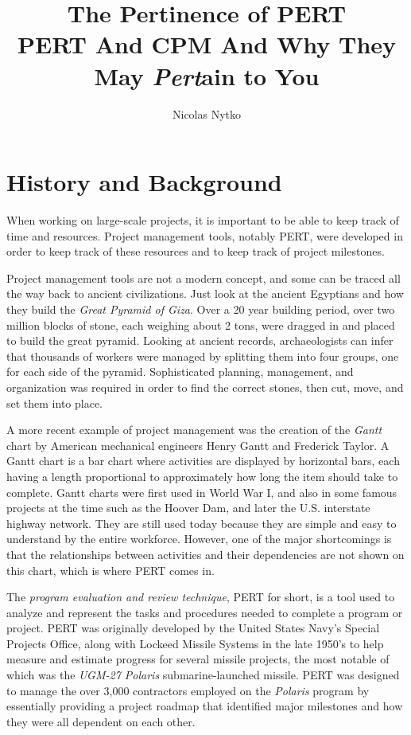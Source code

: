\documentclass[12pt]{article}
\title{The Pertinence of PERT \\[0.25in]
  \small PERT And CPM And Why They May \textit{Pert}ain to You}
\author{Nicolas Nytko}
\begin{document}
\maketitle
\newpage

\doublespacing

\section{History and Background}
When working on large-scale projects, it is important to be able to keep track of time and resources.
Project management tools, notably PERT, were developed in order to keep track of these resources and to keep track of project milestones.

Project management tools are not a modern concept, and some can be traced all the way back to ancient civilizations.  Just look at the ancient Egyptians and how they build the \textit{Great Pyramid of Giza}.  Over a 20 year building period, over two million blocks of stone, each weighing about 2 tons, were dragged in and placed to build the great pyramid.  Looking at ancient records, archaeologists can infer that thousands of workers were managed by splitting them into four groups, one for each side of the pyramid.  Sophisticated planning, management, and organization was required in order to find the correct stones, then cut, move, and set them into place.

A more recent example of project management was the creation of the \textit{Gantt} chart by American mechanical engineers Henry Gantt and Frederick Taylor.
A Gantt chart is a bar chart where activities are displayed by horizontal bars, each having a length proportional to approximately how long the item should take to complete.
Gantt charts were first used in World War I, and also in some famous projects at the time such as the Hoover Dam, and later the U.S. interstate highway network.
They are still used today because they are simple and easy to understand by the entire workforce.
However, one of the major shortcomings is that the relationships between activities and their dependencies are not shown on this chart, which is where PERT comes in.

The \textit{program evaluation and review technique}, PERT for short, is a tool used to analyze and represent the tasks and procedures needed to complete a program or project.
PERT was originally developed by the United States Navy's Special Projects Office, along with Lockeed Missile Systems in the late 1950's to help measure and estimate progress for several missile projects, the most notable of which was the \textit{UGM-27 Polaris} submarine-launched missile.
PERT was designed to manage the over 3,000 contractors employed on the \textit{Polaris} program by essentially providing a project roadmap that identified major milestones and how they were all dependent on each other.
\end{document}
